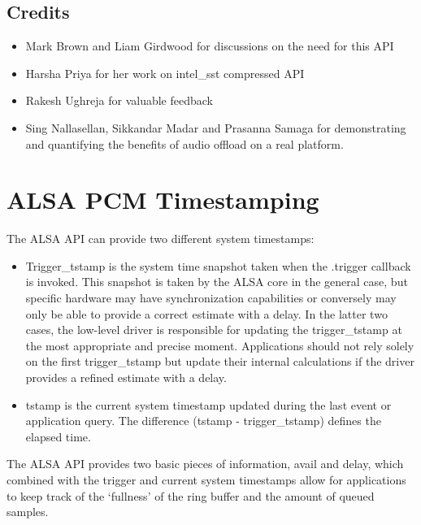 \documentclass[a4paper,8pt,english]{sphinxmanual}
\begin{document}
\subsection{Credits}
\label{sound/designs/compress-offload:credits}\begin{itemize}
\item {} 
Mark Brown and Liam Girdwood for discussions on the need for this API

\item {} 
Harsha Priya for her work on intel\_sst compressed API

\item {} 
Rakesh Ughreja for valuable feedback

\item {} 
Sing Nallasellan, Sikkandar Madar and Prasanna Samaga for
demonstrating and quantifying the benefits of audio offload on a
real platform.

\end{itemize}


\section{ALSA PCM Timestamping}
\label{sound/designs/timestamping:alsa-pcm-timestamping}\label{sound/designs/timestamping::doc}
The ALSA API can provide two different system timestamps:
\begin{itemize}
\item {} 
Trigger\_tstamp is the system time snapshot taken when the .trigger
callback is invoked. This snapshot is taken by the ALSA core in the
general case, but specific hardware may have synchronization
capabilities or conversely may only be able to provide a correct
estimate with a delay. In the latter two cases, the low-level driver
is responsible for updating the trigger\_tstamp at the most appropriate
and precise moment. Applications should not rely solely on the first
trigger\_tstamp but update their internal calculations if the driver
provides a refined estimate with a delay.

\item {} 
tstamp is the current system timestamp updated during the last
event or application query.
The difference (tstamp - trigger\_tstamp) defines the elapsed time.

\end{itemize}

The ALSA API provides two basic pieces of information, avail
and delay, which combined with the trigger and current system
timestamps allow for applications to keep track of the `fullness' of
the ring buffer and the amount of queued samples.
\end{document}
